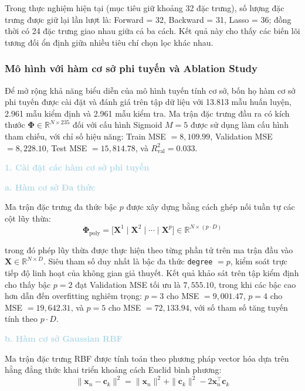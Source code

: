 Trong thực nghiệm hiện tại (mục tiêu giữ khoảng 32 đặc trưng), số lượng đặc trưng được giữ lại lần lượt là:
Forward = 32, Backward = 31, Lasso = 36; đồng thời có 24 đặc trưng giao nhau giữa cả ba cách.
Kết quả này cho thấy các biến lõi tương đối ổn định giữa nhiều tiêu chí chọn lọc khác nhau.

\subsubsection{Mô hình với hàm cơ sở phi tuyến và Ablation Study}

Để mở rộng khả năng biểu diễn của mô hình tuyến tính cơ sở, bốn họ hàm cơ sở
phi tuyến được cài đặt và đánh giá trên tập dữ liệu với 13.813 mẫu huấn luyện,
2.961 mẫu kiểm định và 2.961 mẫu kiểm tra. Ma trận đặc trưng đầu ra có kích
thước $\boldsymbol{\Phi} \in \mathbb{R}^{N \times 235}$ đối với cấu hình
Sigmoid $M=5$ được sử dụng làm cấu hình tham chiếu, với chỉ số hiệu năng:
Train MSE $= 8{,}109.99$, Validation MSE $= 8{,}228.10$, Test MSE $= 15{,}814.78$,
và $R^2_{\mathrm{val}} = 0.033$.

\noindent\textcolor{lightblue}{\textbf{1. Cài đặt các hàm cơ sở phi tuyến}}

\noindent\textcolor{lightblue}{\textbf{a. Hàm cơ sở Đa thức}}

Ma trận đặc trưng đa thức bậc $p$ được xây dựng bằng cách ghép nối
tuần tự các cột lũy thừa:
$$\boldsymbol{\Phi}_{\mathrm{poly}}
  = \bigl[\mathbf{X}^1 \;\Big|\; \mathbf{X}^2 \;\Big|\; \cdots
  \;\Big|\; \mathbf{X}^p\bigr] \in \mathbb{R}^{N \times (p \cdot D)}$$

trong đó phép lũy thừa được thực hiện theo từng phần tử trên
ma trận đầu vào $\mathbf{X} \in \mathbb{R}^{N \times D}$. Siêu tham số
duy nhất là bậc đa thức \texttt{degree} $= p$, kiểm soát trực tiếp độ
linh hoạt của không gian giả thuyết. Kết quả khảo sát trên tập kiểm định
cho thấy bậc $p = 2$ đạt Validation MSE tối ưu là $7{,}555.10$, trong khi
các bậc cao hơn dẫn đến overfitting nghiêm trọng: $p=3$ cho MSE $= 9{,}001.47$,
$p=4$ cho MSE $= 19{,}642.31$, và $p=5$ cho MSE $= 72{,}133.94$,
với số tham số tăng tuyến tính theo $p \cdot D$.

\noindent\textcolor{lightblue}{\textbf{b. Hàm cơ sở Gaussian RBF}}

Ma trận đặc trưng RBF được tính toán theo phương pháp vector hóa
dựa trên hằng đẳng thức khai triển khoảng cách Euclid bình phương:
$$\|\boldsymbol{x}_n - \boldsymbol{c}_k\|^2
  = \|\boldsymbol{x}_n\|^2 + \|\boldsymbol{c}_k\|^2
  - 2\boldsymbol{x}_n^{\top}\boldsymbol{c}_k$$

